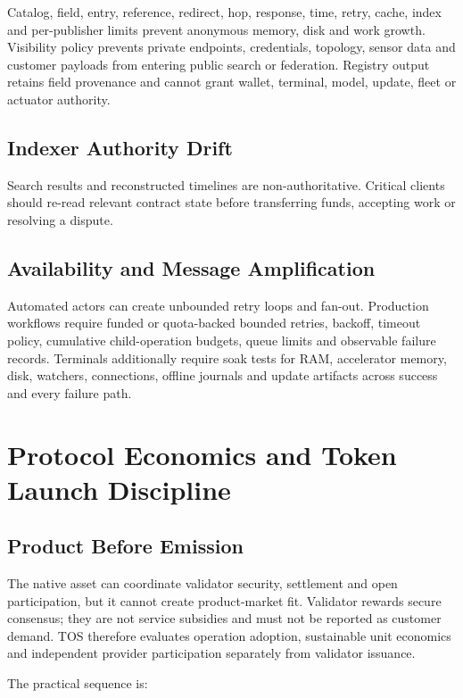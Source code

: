 \documentclass[11pt,oneside]{article}
\begin{document}
Catalog, field, entry, reference, redirect, hop, response, time, retry, cache, index and
per-publisher limits prevent anonymous memory, disk and work growth. Visibility policy
prevents private endpoints, credentials, topology, sensor data and customer payloads from
entering public search or federation. Registry output retains field provenance and cannot
grant wallet, terminal, model, update, fleet or actuator authority.

\subsection{Indexer Authority Drift}

Search results and reconstructed timelines are non-authoritative. Critical clients should
re-read relevant contract state before transferring funds, accepting work or resolving a
dispute.

\subsection{Availability and Message Amplification}

Automated actors can create unbounded retry loops and fan-out. Production workflows require
funded or quota-backed bounded retries, backoff, timeout policy, cumulative child-operation
budgets, queue limits and observable failure records.
Terminals additionally require soak tests for RAM, accelerator memory, disk, watchers,
connections, offline journals and update artifacts across success and every failure path.

\section{Protocol Economics and Token Launch Discipline}

\subsection{Product Before Emission}

The native asset can coordinate validator security, settlement and open participation, but it
cannot create product-market fit. Validator rewards secure consensus; they are not service
subsidies and must not be reported as customer demand. TOS therefore evaluates operation
adoption, sustainable unit economics and independent provider participation separately from
validator issuance.

The practical sequence is:
\end{document}
